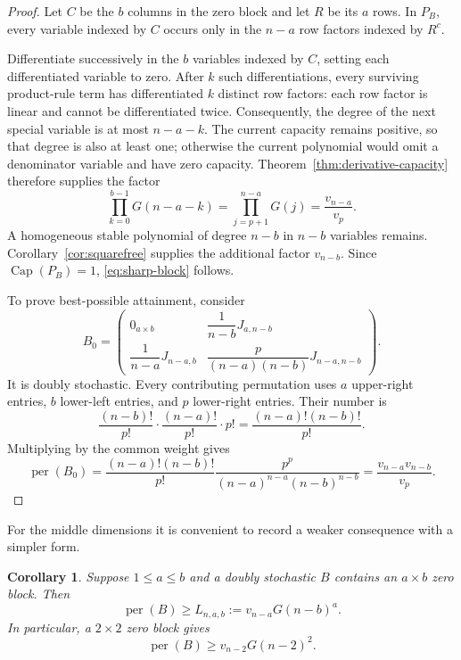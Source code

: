 \documentclass[11pt,a4paper]{article}
\numberwithin{equation}{section}
\newtheorem{corollary}[theorem]{Corollary}
\theoremstyle{definition}
\newcommand{\per}{\operatorname{per}}
\newcommand{\pcap}{\operatorname{Cap}}
\newcommand{\1}{\mathbf{1}}
\begin{document}
\begin{proof}
Let $C$ be the $b$ columns in the zero block and let $R$ be its $a$ rows.  In $P_B$, every variable indexed by $C$ occurs only in the $n-a$ row factors indexed by $R^c$.

Differentiate successively in the $b$ variables indexed by $C$, setting
each differentiated variable to zero.  After $k$ such differentiations,
every surviving product-rule term has differentiated $k$ distinct row
factors: each row factor is linear and cannot be differentiated twice.
Consequently, the degree of the next special variable is at most $n-a-k$.
The current capacity remains positive, so that degree is also at least one;
otherwise the current polynomial would omit a denominator variable and have
zero capacity.  Theorem~\ref{thm:derivative-capacity} therefore supplies the
factor
\[
 \prod_{k=0}^{b-1}G(n-a-k)
 =\prod_{j=p+1}^{n-a}G(j)
 =\frac{v_{n-a}}{v_p}.
\]
A homogeneous stable polynomial of degree $n-b$ in $n-b$ variables remains.  Corollary~\ref{cor:squarefree} supplies the additional factor $v_{n-b}$.  Since $\pcap(P_B)=1$, \eqref{eq:sharp-block} follows.

To prove best-possible attainment, consider
\[
 B_0=
 \begin{pmatrix}
  0_{a\times b} & \dfrac1{n-b}J_{a,n-b}\\[2mm]
  \dfrac1{n-a}J_{n-a,b} &
  \dfrac{p}{(n-a)(n-b)}J_{n-a,n-b}
 \end{pmatrix}.
\]
It is doubly stochastic.  Every contributing permutation uses $a$ upper-right entries, $b$ lower-left entries, and $p$ lower-right entries.  Their number is
\[
 \frac{(n-b)!}{p!}\cdot\frac{(n-a)!}{p!}\cdot p!
 =\frac{(n-a)!(n-b)!}{p!}.
\]
Multiplying by the common weight gives
\[
 \per(B_0)
 =\frac{(n-a)!(n-b)!}{p!}
  \frac{p^p}{(n-a)^{n-a}(n-b)^{n-b}}
 =\frac{v_{n-a}v_{n-b}}{v_p}.
\]
\end{proof}

For the middle dimensions it is convenient to record a weaker consequence with a simpler form.

\begin{corollary}\label{cor:weak-block}
Suppose $1\le a\le b$ and a doubly stochastic $B$ contains an $a\times b$ zero block.  Then
\begin{equation}\label{eq:weak-block}
 \per(B)\ge L_{n,a,b}:=v_{n-a}G(n-b)^a.
\end{equation}
In particular, a $2\times2$ zero block gives
\begin{equation}\label{eq:two-by-two}
 \per(B)\ge v_{n-2}G(n-2)^2.
\end{equation}
\end{corollary}
\end{document}
